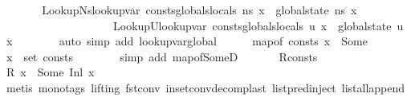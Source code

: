 \begin{isabellebody}
\ \ \ \ \isamarkupfalse%
\ \isamarkupfalse%
\ LookupNs{\isacharcolon}{\kern0pt}{\isachardoublequoteopen}lookup{\isacharunderscore}{\kern0pt}var\ {\isacharparenleft}{\kern0pt}{\isacharparenleft}{\kern0pt}consts{\isacharat}{\kern0pt}globals{\isacharparenright}{\kern0pt}{\isacharcomma}{\kern0pt}locals{\isacharparenright}{\kern0pt}\ ns\ x\ {\isacharequal}{\kern0pt}\ global{\isacharunderscore}{\kern0pt}state\ ns\ x{\isachardoublequoteclose}\ \isanewline
\ \ \ \ \ \ \ \ \ \ \ \ \ \ \ \ \ \ \ \ LookupU{\isacharcolon}{\kern0pt}{\isachardoublequoteopen}lookup{\isacharunderscore}{\kern0pt}var\ {\isacharparenleft}{\kern0pt}{\isacharparenleft}{\kern0pt}consts{\isacharat}{\kern0pt}globals{}{\isacharparenright}{\kern0pt}{\isacharcomma}{\kern0pt}locals{}{\isacharparenright}{\kern0pt}\ u\ x\ {\isacharequal}{\kern0pt}\ global{\isacharunderscore}{\kern0pt}state\ u\ x{\isachardoublequoteclose}\isanewline
\ \ \ \ \ \ \isamarkupfalse%
\ {\isacharparenleft}{\kern0pt}auto\ simp\ add{\isacharcolon}{\kern0pt}\ lookup{\isacharunderscore}{\kern0pt}var{\isacharunderscore}{\kern0pt}global{\isacharparenright}{\kern0pt}\isanewline
\ \ \ \ \isamarkupfalse%
\ {\isacartoucheopen}map{\isacharunderscore}{\kern0pt}of\ consts\ x\ {\isacharequal}{\kern0pt}\ Some\ {\isasymtau}{\isacartoucheclose}\ \isamarkupfalse%
\ {\isachardoublequoteopen}{\isacharparenleft}{\kern0pt}x{\isacharcomma}{\kern0pt}{\isasymtau}{\isacharparenright}{\kern0pt}\ {\isasymin}\ set\ {\isacharparenleft}{\kern0pt}consts{\isacharparenright}{\kern0pt}{\isachardoublequoteclose}\isanewline
\ \ \ \ \ \ \isamarkupfalse%
\ {\isacharparenleft}{\kern0pt}simp\ add{\isacharcolon}{\kern0pt}\ map{\isacharunderscore}{\kern0pt}of{\isacharunderscore}{\kern0pt}SomeD{\isacharparenright}{\kern0pt}\ \isanewline
\ \ \ \ \isamarkupfalse%
\ R{\isacharunderscore}{\kern0pt}consts\ \isamarkupfalse%
\ {\isachardoublequoteopen}R\ x\ {\isacharequal}{\kern0pt}\ Some\ {\isacharparenleft}{\kern0pt}Inl\ x{\isacharparenright}{\kern0pt}{\isachardoublequoteclose}\isanewline
\ \ \ \ \ \ \isamarkupfalse%
\ {\isacharparenleft}{\kern0pt}metis\ {\isacharparenleft}{\kern0pt}mono{\isacharunderscore}{\kern0pt}tags{\isacharcomma}{\kern0pt}\ lifting{\isacharparenright}{\kern0pt}\ fst{\isacharunderscore}{\kern0pt}conv\ in{\isacharunderscore}{\kern0pt}set{\isacharunderscore}{\kern0pt}conv{\isacharunderscore}{\kern0pt}decomp{\isacharunderscore}{\kern0pt}last\ list{\isachardot}{\kern0pt}pred{\isacharunderscore}{\kern0pt}inject{\isacharparenleft}{\kern0pt}{}{\isacharparenright}{\kern0pt}\ list{\isacharunderscore}{\kern0pt}all{\isacharunderscore}{\kern0pt}append{\isacharparenright}{\kern0pt}\ \isanewline

\end{isabellebody}
